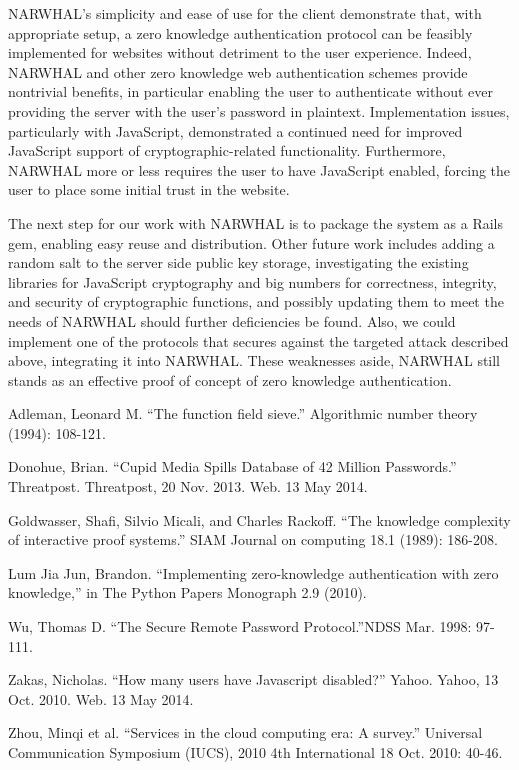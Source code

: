 \documentclass[11pt]{article}
\begin{document}
NARWHAL's simplicity and ease of use for the client demonstrate that, with appropriate setup, a zero knowledge authentication protocol can be feasibly implemented for websites without detriment to the user experience.  Indeed, NARWHAL and other zero knowledge web authentication schemes provide nontrivial benefits, in particular enabling the user to authenticate without ever providing the server with the user's password in plaintext. Implementation issues, particularly with JavaScript, demonstrated a continued need for improved JavaScript support of cryptographic-related functionality.  Furthermore, NARWHAL more or less requires the user to have JavaScript enabled, forcing the user to place some initial trust in the website.

The next step for our work with NARWHAL is to package the system as a Rails gem, enabling easy reuse and distribution.  Other future work includes adding a random salt to the server side public key storage, investigating the existing libraries for JavaScript cryptography and big numbers for correctness, integrity, and security of cryptographic functions, and possibly updating them to meet the needs of NARWHAL should further deficiencies be found.  Also, we could implement one of the protocols that secures against the targeted attack described above, integrating it into NARWHAL. These weaknesses aside, NARWHAL still stands as an effective proof of concept of zero knowledge authentication.

\begin{thebibliography}{9}
Adleman, Leonard M. ``The function field sieve.'' Algorithmic number theory (1994): 108-121.

Donohue, Brian. ``Cupid Media Spills Database of 42 Million Passwords.'' Threatpost. Threatpost, 20 Nov. 2013. Web. 13 May 2014.

Goldwasser, Shafi, Silvio Micali, and Charles Rackoff. ``The knowledge complexity of interactive proof systems.'' SIAM Journal on computing 18.1 (1989): 186-208.

Lum Jia Jun, Brandon. ``Implementing zero-knowledge authentication with zero knowledge,'' in The Python Papers Monograph 2.9 (2010).

Wu, Thomas D. ``The Secure Remote Password Protocol.''NDSS Mar. 1998: 97-111.

Zakas, Nicholas. ``How many users have Javascript disabled?'' Yahoo. Yahoo, 13 Oct. 2010. Web. 13 May 2014.

Zhou, Minqi et al. ``Services in the cloud computing era: A survey.'' Universal Communication Symposium (IUCS), 2010 4th International 18 Oct. 2010: 40-46.

\end{thebibliography}
\end{document}
